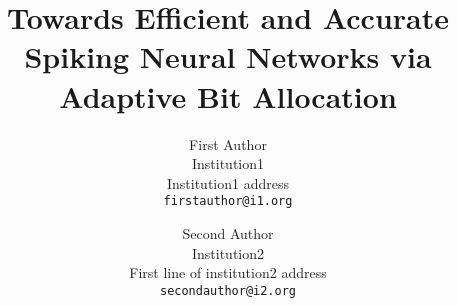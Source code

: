 \documentclass[10pt,twocolumn,letterpaper]{article}
\title{Towards Efficient and Accurate Spiking Neural Networks via Adaptive Bit Allocation}
\author{First Author\\
Institution1\\
Institution1 address\\
{\tt\small firstauthor@i1.org}
\and
Second Author\\
Institution2\\
First line of institution2 address\\
{\tt\small secondauthor@i2.org}
}
\begin{document}
\maketitle
%     
% 
% 
% 










{
    \small
    
    
}




% 
\end{document}
